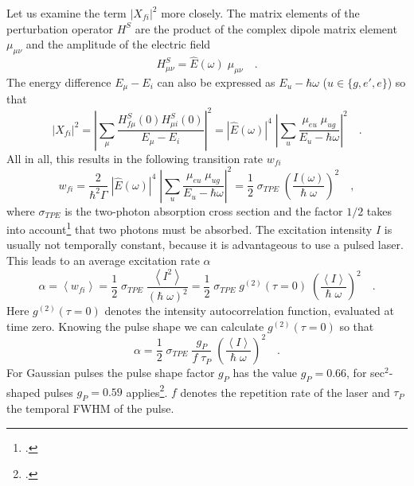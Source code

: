 Let us examine the term $|X_{fi}|^2$  more closely. The matrix elements of the perturbation operator $H^S$ are the product of the complex dipole matrix element $\mu_{\mu \nu}$ and the amplitude of the electric field
\begin{equation}
  H^S_{\mu \nu} = \hat{E}(\omega) \; \mu_{\mu \nu} \quad .
\end{equation}
The energy difference $E_\mu - E_i$ can also be expressed as $E_u - \hbar \omega$ ($u \in \{g, e', e \}$) so that
\begin{equation}
|X_{fi}|^2 = \left| \sum_{\mu} \frac{H^S_{f \mu} (0) H^S_{\mu i}
(0)}{E_{\mu} - E_i} \right|^2 = \left| \hat{E}(\omega) \right|^4
\;  \left| \sum_{u} \frac{\mu_{e u} \; \mu_{u g}}{E_{u} - \hbar
\omega} \right|^2 \quad .
\end{equation}
All in all, this results in the following transition rate $w_{fi}$ 
\begin{equation}
w_{fi} =  \frac{2}{\hbar^2 \Gamma} \; \left| \hat{E}(\omega) \right|^4  \; \left|
\sum_{u} \frac{\mu_{e u} \; \mu_{u g}}{E_{u} - \hbar \omega}
\right|^2 = \frac{1}{2} \; \sigma_{TPE} \;
\left(\frac{I(\omega)}{\hbar \; \omega}\right)^2 \quad ,
\label{eq:tpe_transition_rate}
\end{equation}
where $\sigma_{TPE}$ is the two-photon absorption cross section and the factor $1/2$ takes into account\footcite{xu97} that two photons must be absorbed. The excitation intensity $I$ is  usually not temporally constant, because it is advantageous to use a pulsed laser. This leads to an average excitation rate $\alpha$
\begin{equation}
  \alpha = \left< w_{fi} \right> =
  \frac{1}{2} \; \sigma_{TPE} \; \frac{ \left<I^2 \right>}{(\hbar \; \omega)^2}
  = \frac{1}{2} \; \sigma_{TPE} \; g^{(2)}(\tau = 0) \;
  \left(\frac{\left< I \right>}{\hbar \; \omega}\right)^2 \quad .
\end{equation}
Here $g^{(2)}(\tau = 0)$ denotes the  intensity autocorrelation function, evaluated at  time zero.  Knowing the pulse shape we can calculate $g^{(2)}(\tau= 0)$ so that
\begin{equation}
  \alpha
  = \frac{1}{2} \; \sigma_{TPE} \; \frac{g_P}{f \; \tau_P} \;
  \left(\frac{\left< I \right>}{\hbar \; \omega}\right)^2 \quad .
\end{equation}
For Gaussian pulses the pulse shape factor $g_P$ has the value $g_P = 0.66$, for sec$^2$-shaped pulses $g_P = 0.59$ applies\footcite{xu97}. $f$ denotes the repetition rate of the laser and $\tau_P$ the temporal FWHM of the pulse. 



